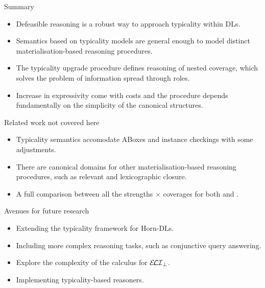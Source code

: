 \documentclass[10pt]{beamer}
\begin{document}
\begin{frame}[fragile] {Summary}

\begin{itemize}
  \item Defeasible reasoning is a robust way to approach typicality within DLs.
  \item Semantics based on typicality models are general enough to model distinct materialisation-based reasoning procedures.
  \item The typicality upgrade procedure defines reasoning of nested coverage, which solves the problem of information spread through roles.
  \item Increase in expressivity come with costs and the procedure depends fundamentally on the simplicity of the canonical structures.
\end{itemize}

\end{frame}


\begin{frame}[fragile]{Related work not covered here}
\begin{itemize}
  \item Typicality semantics accomodate ABoxes and instance checkings with some adjustments.
  \item There are canonical domains for other materialisation-based reasoning procedures, such as relevant and lexicographic closure.
  \item A full comparison between all the strengths $\times$ coverages for both \ELbot and \ELIbot.
\end{itemize}
\end{frame}


\begin{frame}[fragile]{Avenues for future research}
  \begin{itemize}
    \item Extending the typicality framework for Horn-DLs.
    \item Including more complex reasoning tasks, such as conjunctive query answering.
    \item Explore the complexity of the calculus for $\mathcal{E\!LI}_\bot$.
    \item Implementing typicality-based reasoners.
  \end{itemize}
\end{frame}
\end{document}
